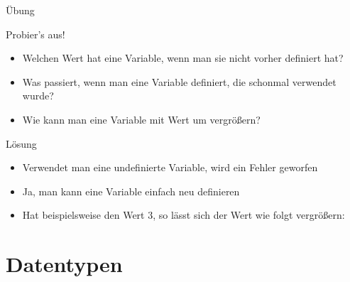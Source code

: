 \begin{frame}

\end{frame}

\begin{frame}{Übung}
	
	\begin{block}{Probier's aus!}
		\begin{itemize}
			\item Welchen Wert hat eine Variable, wenn man sie nicht vorher definiert hat? 
			\item Was passiert, wenn man eine Variable definiert, die schonmal verwendet wurde?
			\item Wie kann man eine Variable mit Wert  um  vergrößern?
		\end{itemize}	
	\end{block}
\vspace{12pt}
\begin{solutionblock}{Lösung}
	\begin{itemize}
		\item Verwendet man eine undefinierte Variable, wird ein Fehler geworfen
		\item Ja, man kann eine Variable einfach neu definieren
		\item Hat beispielsweise  den Wert 3, so lässt sich der Wert wie folgt vergrößern: 
	\end{itemize}
\end{solutionblock}
\end{frame}
	

\section{Datentypen}

